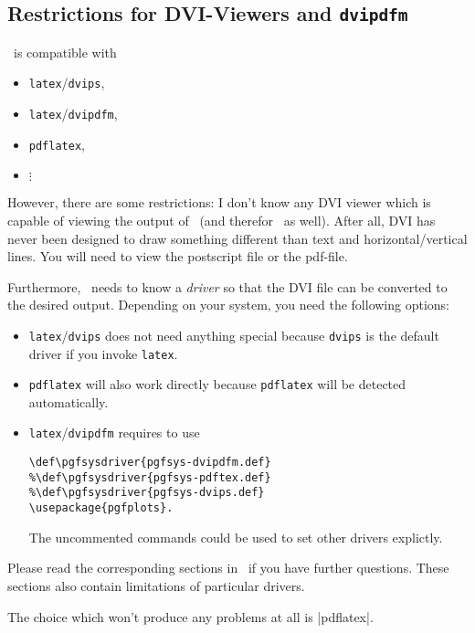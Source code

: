 \subsection{Restrictions for DVI-Viewers and \texttt{dvipdfm}}
\label{sec:drivers}%
\PGF\ is compatible with 
\begin{itemize}
	\item \lstinline!latex!/\lstinline!dvips!,
	\item \lstinline!latex!/\lstinline!dvipdfm!,
	\item \lstinline!pdflatex!,
	\item $\vdots$
\end{itemize}
However, there are some restrictions: I don't know any DVI viewer which is capable of viewing the output of \PGF\ (and therefor \PGFPlots\ as well). After all, DVI has never been designed to draw something different than text and horizontal/vertical lines. You will need to view the postscript file or the pdf-file.

Furthermore, \PGF\ needs to know a \emph{driver} so that the DVI file can be converted to the desired output. Depending on your system, you need the following options:
\begin{itemize}
	\item \lstinline!latex!/\lstinline!dvips! does not need anything special because \lstinline!dvips! is the default driver if you invoke \lstinline!latex!.
	\item \lstinline!pdflatex! will also work directly because \lstinline!pdflatex! will be detected automatically.
	\item \lstinline!latex!/\lstinline!dvipdfm! requires to use
\begin{lstlisting}
\def\pgfsysdriver{pgfsys-dvipdfm.def}
%\def\pgfsysdriver{pgfsys-pdftex.def}
%\def\pgfsysdriver{pgfsys-dvips.def}
\usepackage{pgfplots}.
\end{lstlisting}
	The uncommented commands could be used to set other drivers explictly.
\end{itemize}
Please read the corresponding sections in~\cite[Section 7.2.1 and 7.2.2]{tikz} if you have further questions. These sections also contain limitations of particular drivers.

The choice which won't produce any problems at all is |pdflatex|.
